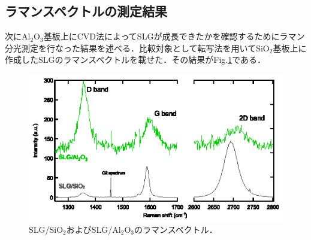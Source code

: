 \subsection{ラマンスペクトルの測定結果}
次にAl$_{2}$O$_{3}$基板上にCVD法によってSLGが成長できたかを確認するためにラマン分光測定を行なった結果を述べる．比較対象として転写法を用いてSiO$_{2}$基板上に作成したSLGのラマンスペクトルを載せた．その結果がFig.\ref{fig:raman_init}である．
\begin{figure}[htbp]
\centerline{
\includegraphics[width=12cm]{images/raman_init.eps}
}
\caption{SLG/SiO$_{2}$およびSLG/Al$_{2}$O$_{3}$のラマンスペクトル．
}
\label{fig:raman_init} 
\end{figure}

